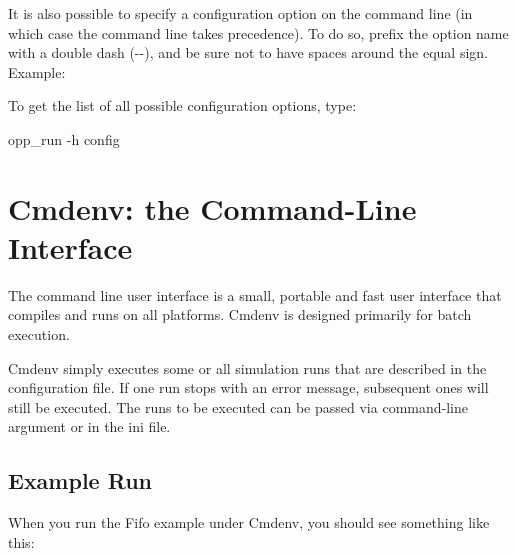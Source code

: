 \begin{note}
  It is also possible to specify a configuration option on the command line (in which case the
  command line takes precedence). To do so, prefix the option name with a double
  dash (-{}-), and be sure not to have spaces around the equal sign. Example:
\end{note}

To get the list of all possible configuration options, type:

\begin{commandline}
opp_run -h config
\end{commandline}


\section{Cmdenv: the Command-Line Interface}
\label{sec:run-sim:cmdenv}

The command line user interface is
a small, portable and fast user interface that compiles and runs on
all platforms. Cmdenv is designed primarily for batch execution.

Cmdenv simply executes some or all simulation runs that are described
in the configuration file. If one run stops with an error message,
subsequent ones will still be executed. The runs to be executed can be
passed via command-line argument or in the ini file.

\subsection{Example Run}
\label{sec:run-sim:cmdenv-example-run}

When you run the Fifo example under Cmdenv, you should see
something like this:

